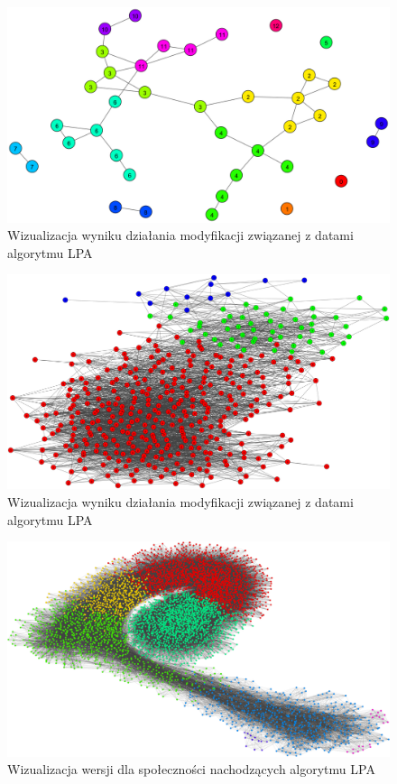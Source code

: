 \documentclass{article}
\begin{document}
\begin{figure}[H]
\centering
\includegraphics[width=\textwidth]{images/ms-lpa-m1-0.png}
\caption{Wizualizacja wyniku działania modyfikacji związanej z datami algorytmu LPA} 
\end{figure}

\begin{figure}[H]
\centering
\includegraphics[width=\textwidth]{images/ms-lpa-m1-2.png}
\caption{Wizualizacja wyniku działania modyfikacji związanej z datami algorytmu LPA}
\end{figure}

\begin{figure}[H]
\centering
\includegraphics[width=\textwidth]{images/ms-m1-nba.png}
\caption{Wizualizacja wersji dla społeczności nachodzących algorytmu LPA}
\end{figure}
\end{document}
